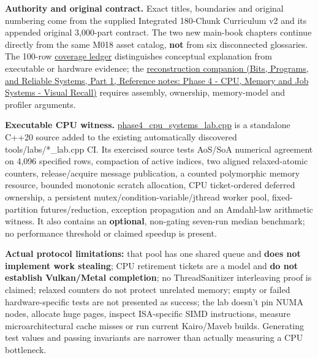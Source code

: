 \textbf{Authority and original contract.} Exact titles, boundaries and original numbering come from the supplied Integrated 180-Chunk Curriculum v2 and its appended original 3,000-part contract. The two new main-book chapters continue directly from the same M018 asset catalog, \textbf{not} from six disconnected glossaries. The 100-row \hyperref[appendix-fd090d982a15-phase-4-cpu-architecture-and-measured-execution-parts-301400]{coverage ledger} distinguishes conceptual explanation from executable or hardware evidence; the \href{../01-Bits-Programs-and-Reliable-Systems-P01/main.pdf\#nameddest=appendix-2587680a4fe3}{reconstruction companion (Bits, Programs, and Reliable Systems, Part 1, Reference notes: Phase 4 - CPU, Memory and Job Systems - Visual Recall)} requires assembly, ownership, memory-model and profiler arguments.

\textbf{Executable CPU witness.} \hyperref[source-file-0060a91bd24dd25d6c14e679]{phase4\_cpu\_systems\_lab.cpp} is a standalone C++20 source added to the existing automatically discovered tools/labs/*\_lab.cpp CI. Its exercised source tests AoS/SoA numerical agreement on 4,096 specified rows, compaction of active indices, two aligned relaxed-atomic counters, release/acquire message publication, a counted polymorphic memory resource, bounded monotonic scratch allocation, CPU ticket-ordered deferred ownership, a persistent mutex/condition-variable/jthread worker pool, fixed-partition futures/reduction, exception propagation and an Amdahl-law arithmetic witness. It also contains an \textbf{optional}, non-gating seven-run median benchmark; no performance threshold or claimed speedup is present.

\textbf{Actual protocol limitations:} that pool has one shared queue and \textbf{does not implement work stealing}; CPU retirement tickets are a model and \textbf{do not establish Vulkan/Metal completion}; no ThreadSanitizer interleaving proof is claimed; relaxed counters do not protect unrelated memory; empty or failed hardware-specific tests are not presented as success; the lab doesn't pin NUMA nodes, allocate huge pages, inspect ISA-specific SIMD instructions, measure microarchitectural cache misses or run current Kairo/Maveb builds. Generating test values and passing invariants are narrower than actually measuring a CPU bottleneck.

